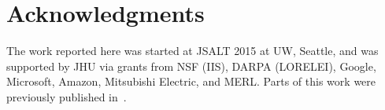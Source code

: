 \section{Acknowledgments}
The work reported here was started at JSALT 2015 at UW, Seattle, and
was supported by JHU via grants from NSF (IIS), DARPA (LORELEI),
Google, Microsoft, Amazon, Mitsubishi Electric, and MERL.  Parts of
this work were previously published in~\cite{Liu15}.
